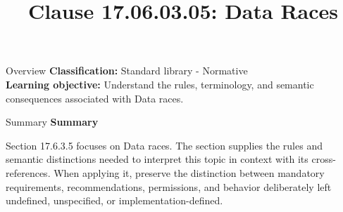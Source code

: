 \documentclass[10pt,letterpaper]{article}
\title{Clause 17.06.03.05: Data Races}
\author{}
\date{}
\begin{document}
\maketitle
\begin{CornellOverviewBox}{Overview}
\textbf{Classification:} Standard library - Normative\\[2pt]
\textbf{Learning objective:} Understand the rules, terminology, and semantic consequences associated with Data races.
\end{CornellOverviewBox}\begin{CornellSummaryBox}{Summary}
{\sffamily\bfseries\color{Accent} Summary}\par\vspace{3pt}Section 17.6.3.5 focuses on Data races. The section supplies the rules and semantic distinctions needed to interpret this topic in context with its cross-references. When applying it, preserve the distinction between mandatory requirements, recommendations, permissions, and behavior deliberately left undefined, unspecified, or implementation-defined.
\end{CornellSummaryBox}
\end{document}
